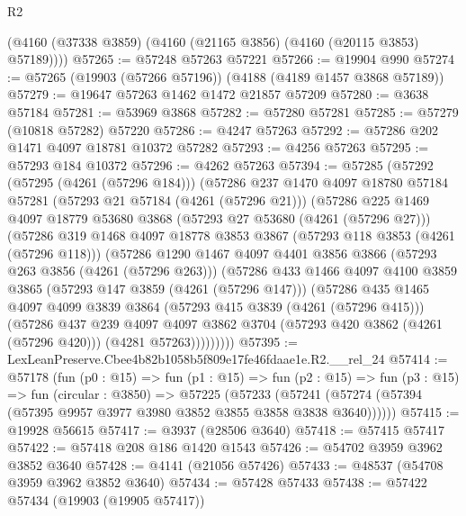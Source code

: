 \begin{lexlean}{R2}
\begin{coremodule}
      (@4160 (@37338 @3859) (@4160 (@21165 @3856) (@4160 (@20115 @3853) @57189))))
@57265 := @57248 @57263 @57221
@57266 := @19904 @990
@57274 := @57265 (@19903 (@57266 @57196)) (@4188 (@4189 @1457 @3868 @57189))
@57279 := @19647 @57263 @1462 @1472 @21857 @57209
@57280 := @3638 @57184
@57281 := @53969 @3868
@57282 := @57280 @57281
@57285 := @57279 (@10818 @57282) @57220
@57286 := @4247 @57263
@57292 := @57286 @202 @1471 @4097 @18781 @10372 @57282
@57293 := @4256 @57263
@57295 := @57293 @184 @10372
@57296 := @4262 @57263
@57394 := @57285
    (@57292
      (@57295 (@4261 (@57296 @184)))
      (@57286
        @237
        @1470
        @4097
        @18780
        @57184
        @57281
        (@57293 @21 @57184 (@4261 (@57296 @21)))
        (@57286
          @225
          @1469
          @4097
          @18779
          @53680
          @3868
          (@57293 @27 @53680 (@4261 (@57296 @27)))
          (@57286
            @319
            @1468
            @4097
            @18778
            @3853
            @3867
            (@57293 @118 @3853 (@4261 (@57296 @118)))
            (@57286
              @1290
              @1467
              @4097
              @4401
              @3856
              @3866
              (@57293 @263 @3856 (@4261 (@57296 @263)))
              (@57286
                @433
                @1466
                @4097
                @4100
                @3859
                @3865
                (@57293 @147 @3859 (@4261 (@57296 @147)))
                (@57286
                  @435
                  @1465
                  @4097
                  @4099
                  @3839
                  @3864
                  (@57293 @415 @3839 (@4261 (@57296 @415)))
                  (@57286
                    @437
                    @239
                    @4097
                    @4097
                    @3862
                    @3704
                    (@57293 @420 @3862 (@4261 (@57296 @420)))
                    (@4281 @57263)))))))))
@57395 := LexLeanPreserve.Cbee4b82b1058b5f809e17fe46fdaae1e.R2.__rel_24
@57414 := @57178
    (fun (p0 : @15) =>
    fun (p1 : @15) =>
    fun (p2 : @15) =>
    fun (p3 : @15) =>
    fun (circular : @3850) =>
    @57225
      (@57233 (@57241 (@57274 (@57394 (@57395 @9957 @3977 @3980 @3852 @3855 @3858 @3838 @3640))))))
@57415 := @19928 @56615
@57417 := @3937 (@28506 @3640)
@57418 := @57415 @57417
@57422 := @57418 @208 @186 @1420 @1543
@57426 := @54702 @3959 @3962 @3852 @3640
@57428 := @4141 (@21056 @57426)
@57433 := @48537 (@54708 @3959 @3962 @3852 @3640)
@57434 := @57428 @57433
@57438 := @57422 @57434 (@19903 (@19905 @57417))

\end{coremodule}
\end{lexlean}
